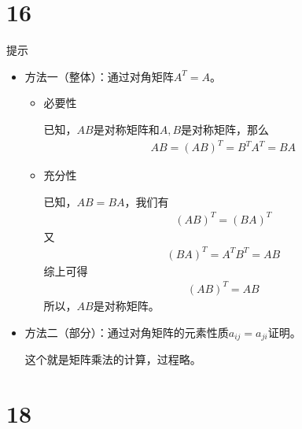\documentclass{article}
\begin{document}
\section*{16}

提示
\begin{itemize}
  \item 方法一（整体）：通过对角矩阵$A^T = A$。

        \begin{itemize}
          \item 必要性

                已知，$AB$是对称矩阵和$A,B$是对称矩阵，那么
                \begin{align*}
                  AB = (AB)^T = B^T A^T = B A
                \end{align*}
          \item 充分性

                已知，$AB = BA$，我们有
                \begin{align*}
                  (AB)^T = (BA)^T
                \end{align*}
                又
                \begin{align*}
                  (BA)^T = A^T B^T = A B
                \end{align*}
                综上可得
                \begin{align*}
                  (AB)^T = AB
                \end{align*}
                所以，$AB$是对称矩阵。
        \end{itemize}

  \item 方法二（部分）：通过对角矩阵的元素性质$a_{ij} = a_{ji}$证明。

        这个就是矩阵乘法的计算，过程略。
\end{itemize}

\section*{18}
\end{document}
